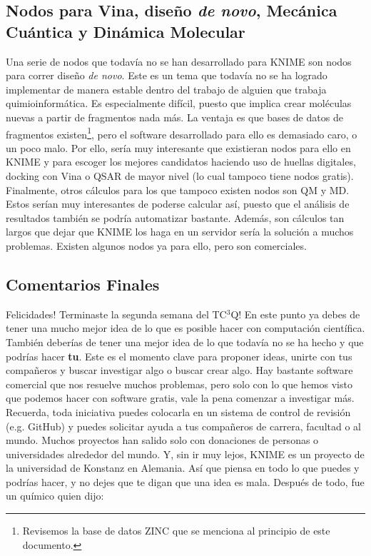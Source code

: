 \documentclass[10pt,letterpaper]{article}
\begin{document}
\subsection{Nodos para Vina, dise\~no \emph{de novo}, Mec\'anica Cu\'antica y Din\'amica Molecular}
Una serie de nodos que todav\'ia no se han desarrollado para KNIME son nodos para correr dise\~no \emph{de novo}. Este es un tema que todav\'ia no se ha logrado implementar de manera estable dentro del trabajo de alguien que trabaja quimioinform\'atica. Es especialmente dif\'icil, puesto que implica crear mol\'eculas nuevas a partir de fragmentos nada m\'as. La ventaja es que bases de datos de fragmentos existen\footnote{Revisemos la base de datos ZINC que se menciona al principio de este documento.}, pero el software desarrollado para ello es demasiado caro, o un poco malo. Por ello, ser\'ia muy interesante que existieran nodos para ello en KNIME y para escoger los mejores candidatos haciendo uso de huellas digitales, docking con Vina o QSAR de mayor nivel (lo cual tampoco tiene nodos gratis).\\

Finalmente, otros c\'alculos para los que tampoco existen nodos son QM y MD. Estos ser\'ian muy interesantes de poderse calcular as\'i, puesto que el an\'alisis de resultados tambi\'en se podr\'ia automatizar bastante. Adem\'as, son c\'alculos tan largos que dejar que KNIME los haga en un servidor ser\'ia la soluci\'on a muchos problemas. Existen algunos nodos ya para ello, pero son comerciales.

\subsection{Comentarios Finales}
Felicidades! Terminaste la segunda semana del TC$^3$Q! En este punto ya debes de tener una mucho mejor idea de lo que es posible hacer con computaci\'on cient\'ifica. Tambi\'en deber\'ias de tener una mejor idea de lo que todav\'ia no se ha hecho y que podr\'ias hacer \textbf{tu}. Este es el momento clave para proponer ideas, unirte con tus compa\~neros y buscar investigar algo o buscar crear algo. Hay bastante software comercial que nos resuelve muchos problemas, pero solo con lo que hemos visto que podemos hacer con software gratis, vale la pena comenzar a investigar m\'as.\\

Recuerda, toda iniciativa puedes colocarla en un sistema de control de revisi\'on (e.g. GitHub) y puedes solicitar ayuda a tus compa\~neros de carrera, facultad o al mundo. Muchos proyectos han salido solo con donaciones de personas o universidades alrededor del mundo. Y, sin ir muy lejos, KNIME es un proyecto de la universidad de Konstanz en Alemania. As\'i que piensa en todo lo que puedes y podr\'ias hacer, y no dejes que te digan que una idea es mala. Despu\'es de todo, fue un qu\'imico quien dijo:
\end{document}
